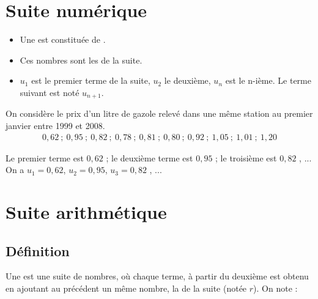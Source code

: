 \documentclass[12pt,a4paper]{article}
\date{}
\title{}
\begin{document}
{}

\section{Suite numérique}

\begin{mydef}
	\begin{itemize}
		\item Une  est constituée de .
		\item Ces nombres sont les  de la suite.
		\item $u_1$ est le premier terme de la suite, $u_2$ le deuxième, $u_n$ est le n-ième. Le terme suivant est noté $u_{n+1}$.
	\end{itemize}
	
\end{mydef}

\begin{myex}
	On considère le prix d'un litre de gazole relevé dans une même station au premier janvier entre 1999 et 2008.
	\begin{align*}
	0,62 \:;\: 0,95 \:;\: 0,82 \:; \:0,78 \:;\: 0,81 \:;\: 0,80 \:;\: 0,92 \:;\: 1,05 \:;\: 1,01 \:; \:1,20
	\end{align*}
	
	Le premier terme est $0,62$ ; le deuxième terme est $0,95$ ; le troisième est $0,82$ , ...
	On a
	$u_1=0,62$, $u_2=0,95$, $u_3=0,82$ , ...
\end{myex}

\section{Suite arithmétique}

\subsection{Définition}
\begin{mydef}
	Une  est une suite de nombres, où chaque terme, à partir du deuxième est obtenu en ajoutant au précédent un même nombre, la  de la suite (notée $r$).	
	On note :
\end{mydef}
\end{document}
